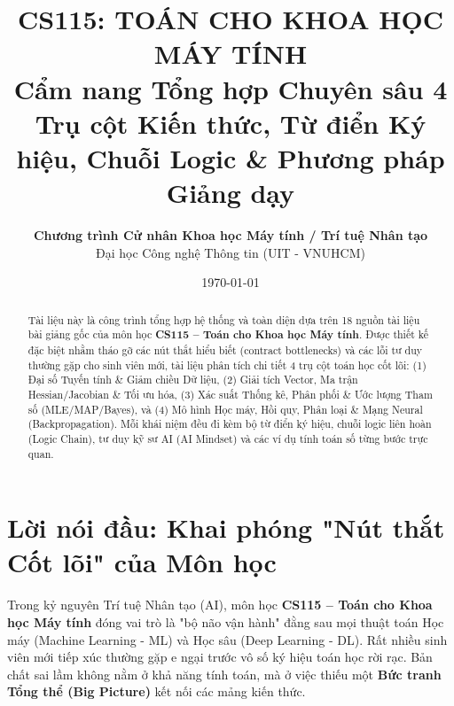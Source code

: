 \documentclass[11pt,a4paper]{article}
\title{\Huge \textbf{CS115: TOÁN CHO KHOA HỌC MÁY TÍNH}\\[0.3em]
\Large Cẩm nang Tổng hợp Chuyên sâu 4 Trụ cột Kiến thức, Từ điển Ký hiệu, Chuỗi Logic \& Phương pháp Giảng dạy}
\author{\textbf{Chương trình Cử nhân Khoa học Máy tính / Trí tuệ Nhân tạo}\\Đại học Công nghệ Thông tin (UIT - VNUHCM)}
\date{\today}
\begin{document}
\maketitle

\begin{abstract}
Tài liệu này là công trình tổng hợp hệ thống và toàn diện dựa trên 18 nguồn tài liệu bài giảng gốc của môn học \textbf{CS115 -- Toán cho Khoa học Máy tính}. Được thiết kế đặc biệt nhằm tháo gỡ các nút thắt hiểu biết (contract bottlenecks) và các lỗi tư duy thường gặp cho sinh viên mới, tài liệu phân tích chi tiết 4 trụ cột toán học cốt lõi: (1) Đại số Tuyến tính \& Giảm chiều Dữ liệu, (2) Giải tích Vector, Ma trận Hessian/Jacobian \& Tối ưu hóa, (3) Xác suất Thống kê, Phân phối \& Ước lượng Tham số (MLE/MAP/Bayes), và (4) Mô hình Học máy, Hồi quy, Phân loại \& Mạng Neural (Backpropagation). Mỗi khái niệm đều đi kèm bộ từ điển ký hiệu, chuỗi logic liên hoàn (Logic Chain), tư duy kỹ sư AI (AI Mindset) và các ví dụ tính toán số từng bước trực quan.
\end{abstract}

\tableofcontents
\newpage

\section*{Lời nói đầu: Khai phóng "Nút thắt Cốt lõi" của Môn học}

Trong kỷ nguyên Trí tuệ Nhân tạo (AI), môn học \textbf{CS115 -- Toán cho Khoa học Máy tính} đóng vai trò là "bộ não vận hành" đằng sau mọi thuật toán Học máy (Machine Learning - ML) và Học sâu (Deep Learning - DL). Rất nhiều sinh viên mới tiếp xúc thường gặp e ngại trước vô số ký hiệu toán học rời rạc. Bản chất sai lầm không nằm ở khả năng tính toán, mà ở việc thiếu một \textbf{Bức tranh Tổng thể (Big Picture)} kết nối các mảng kiến thức.
\end{document}
